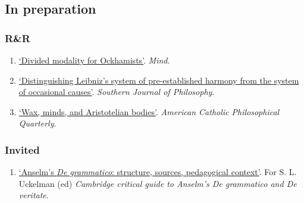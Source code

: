 \subsection{In preparation}
\subsubsection{R\&R}
\begin{enumerate}
	\setcounter{enumi}{\value{publicationCounter}}	%
	\item \datedsubsectionnarrow{}
	{}
	{
		\href{}{`Divided modality for Ockhamists'}. \emph{Mind}.}
	{}
	\item \datedsubsectionnarrow{}
{}
{
	\href{}{`Distinguishing Leibniz's system of pre-established harmony from the system of occasional causes'}. \emph{Southern Journal of Philosophy}.}
{}
	\item \datedsubsectionnarrow{}
{}
{
	\href{}{`Wax, minds, and Aristotelian bodies'}. \emph{American Catholic Philosophical Quarterly}.}
{}
	\setcounter{publicationCounter}{\value{enumi}}	%
\end{enumerate}
\subsubsection{Invited}
\begin{enumerate}
	\setcounter{enumi}{\value{publicationCounter}}	%
	\item \datedsubsectionnarrow{}
	{}
	{
		\href{}{`Anselm's \emph{De grammatico}: structure, sources, pedagogical context'}. For S. L. Uckelman (ed) \emph{Cambridge critical guide to Anselm's De grammatico and De veritate}.}
	{}
	\setcounter{publicationCounter}{\value{enumi}}	%
\end{enumerate}
